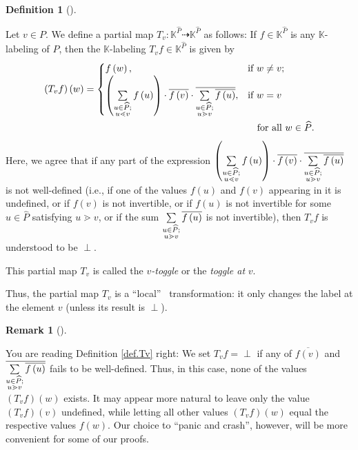 \documentclass[numbers=enddot,12pt,final,onecolumn,notitlepage]{scrartcl}%
\theoremstyle{definition}
\newtheorem{defi}[theo]{Definition}
\newenvironment{definition}[1][]
{\begin{defi}[#1]\begin{leftbar}}
{\end{leftbar}\end{defi}}
\newtheorem{remk}[theo]{Remark}
\newenvironment{remark}[1][]
{\begin{remk}[#1]\begin{leftbar}}
{\end{leftbar}\end{remk}}
\newcommand{\undf}{\operatorname*{\bot}}
\let\sumnonlimits\sum
\renewcommand{\sum}{\sumnonlimits\limits}
\begin{document}
\begin{definition}
\label{def.Tv}Let $v\in P$. We define a partial map $T_{v}:\mathbb{K}%
^{\widehat{P}}\dashrightarrow\mathbb{K}^{\widehat{P}}$ as follows: If
$f\in\mathbb{K}^{\widehat{P}}$ is any $\mathbb{K}$-labeling of $P$, then the
$\mathbb{K}$-labeling $T_{v} f \in\mathbb{K}^{\widehat{P}}$ is given by
\begin{align}
\left(  T_{v}f\right)  \left(  w\right)   &  =%
\begin{cases}
f\left(  w\right)  , & \text{if }w\neq v;\\
\left(  \sum\limits_{\substack{u\in\widehat{P};\\u\lessdot v}}f\left(
u\right)  \right)  \cdot\overline{f\left(  v\right)  }\cdot\overline
{\sum\limits_{\substack{u\in\widehat{P};\\u\gtrdot v}}\overline{f\left(
u\right)  }}, & \text{if }w=v
\end{cases}
\label{def.Tv.def}\\
&  \qquad\qquad\qquad\qquad\qquad\qquad\qquad\qquad\qquad\text{for all }%
w\in\widehat{P}.\nonumber
\end{align}
Here, we agree that if any part of the expression $\left(  \sum
\limits_{\substack{u\in\widehat{P};\\u\lessdot v}}f\left(  u\right)  \right)
\cdot\overline{f\left(  v\right)  }\cdot\overline{\sum\limits_{\substack{u\in
\widehat{P};\\u\gtrdot v}}\overline{f\left(  u\right)  }}$ is not well-defined
(i.e., if one of the values $f\left(  u\right)  $ and $f\left(  v\right)  $
appearing in it is undefined, or if $f\left(  v\right)  $ is not invertible,
or if $f\left(  u\right)  $ is not invertible for some $u\in\widehat{P}$
satisfying $u\gtrdot v$, or if the sum $\sum\limits_{\substack{u\in
\widehat{P};\\u\gtrdot v}}\overline{f\left(  u\right)  }$ is not invertible),
then $T_{v}f$ is understood to be $\undf$.

This partial map $T_{v}$ is called the $v$\emph{-toggle} or the \emph{toggle
at }$v$.
\end{definition}

Thus, the partial map $T_{v}$ is a \textquotedblleft local\textquotedblright%
\ transformation: it only changes the label at the element $v$ (unless its
result is $\undf$).

\begin{remark}
You are reading Definition \ref{def.Tv} right: We set $T_{v}f=\undf$ if any of
$\overline{f\left(  v\right)  }$ and $\overline{\sum\limits_{\substack{u\in
\widehat{P};\\u\gtrdot v}}\overline{f\left(  u\right)  }}$ fails to be
well-defined. Thus, in this case, none of the values $\left(  T_{v}f\right)
\left(  w\right)  $ exists. It may appear more natural to leave only the value
$\left(  T_{v}f\right)  \left(  v\right)  $ undefined, while letting all other
values $\left(  T_{v}f\right)  \left(  w\right)  $ equal the respective values
$f\left(  w\right)  $. Our choice to \textquotedblleft panic and
crash\textquotedblright, however, will be more convenient for some of our proofs.
\end{remark}
\end{document}
